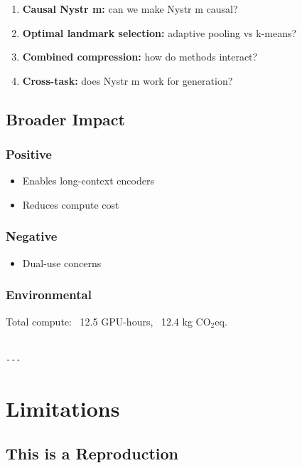 \begin{enumerate}
\item \textbf{Causal Nystr m:} can we make Nystr m causal?
\item \textbf{Optimal landmark selection:} adaptive pooling vs k-means?
\item \textbf{Combined compression:} how do methods interact?
\item \textbf{Cross-task:} does Nystr m work for generation?

\end{enumerate}
\subsection{Broader Impact}

\subsubsection{Positive}
\begin{itemize}
\item Enables long-context encoders
\item Reduces compute cost

\end{itemize}
\subsubsection{Negative}
\begin{itemize}
\item Dual-use concerns

\end{itemize}
\subsubsection{Environmental}
Total compute: ~12.5 GPU-hours, ~12.4 kg CO$_2$eq.
\begin{lstlisting}

---
\end{lstlisting}


\section{Limitations}

\subsection{This is a Reproduction}

